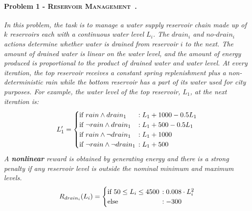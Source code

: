 \documentclass[letterpaper]{article}
\newcommand{\Reservoir}{\textsc{Reservoir Management}}
\begin{document}
\paragraph{\bf Problem 1 - \Reservoir~\cite{Yeh1985,Mahootchi2009}. \label{ex1}}
\textit{
In this problem, the task is to manage a water supply reservoir chain made up of $k$ reservoirs each with a continuous water level $L_i$.
The $drain_i$ and $no$-$drain_i$ actions determine whether water is drained from reservoir $i$ to the next.
The amount of drained water is linear on the water level, and the amount of energy produced is proportional to the product of drained water and water level.
At every iteration, the top reservoir receives a constant spring replenishment plus a non-deterministic rain while the bottom reservoir has a part of its water used for city purposes. For example, the water level of the top reservoir, $L_1$, at the next iteration is:
{\small
\hspace{-2mm}
\begin{align*}
L_1' =
\begin{cases}
  \text{if }  rain \wedge drain_1 &\hspace{-2mm}: L_1 + 1000 - 0.5L_1\\ 
  \text{if }  \neg rain \wedge drain_1 &\hspace{-2mm}: L_1 + 500 - 0.5L_1\\ 
  \text{if }  rain \wedge \neg drain_1 &\hspace{-2mm}: L_1 + 1000\\ 
  \text{if }  \neg rain \wedge \neg drain_1 &\hspace{-2mm}: L_1 + 500\\ 
\end{cases}
\end{align*}
}
A {\bf nonlinear} reward is obtained by generating energy and there is a strong penalty if any reservoir level is outside the nominal minimum and maximum levels.
{\small
\begin{align*}
R_{drain_i} (L_i)=
\begin{cases}
  \text{if }  50 \leq L_i \leq 4500 &\hspace{-2mm} : 0.008\cdot L_i^2\\ 
  \text{else}  &\hspace{-2mm} : -300\\ 
\end{cases}
\end{align*}
}
}
\end{document}

